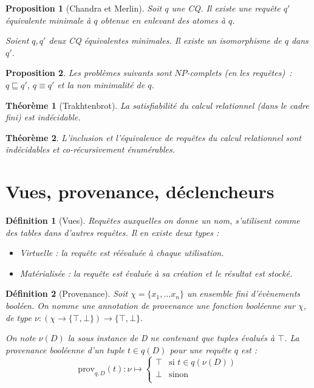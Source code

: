 \documentclass[landscape]{article}
\newcommand{\1}{\mathbbm{1}}
\newcommand{\0}{\mathbbm{0}}
\newtheorem{theo}{Théorème}
\newtheorem{prop}{Proposition}
\newtheorem{defi}{Définition}
\begin{document}
\begin{multicols}{2}
    \begin{prop}[Chandra et Merlin] Soit $q$ une CQ. Il existe une requête $q'$
        équivalente minimale à $q$ obtenue en enlevant des atomes à $q$.

        Soient $q,q'$ deux CQ équivalentes minimales. Il existe un isomorphisme
        de $q$ dans $q'$.
    \end{prop}

    \begin{prop} Les problèmes suivants sont $NP$-complets (en les requêtes)~: $q\sqsubseteq q'$,
        $q \equiv q'$ et la non minimalité de $q$.
    \end{prop}

    \begin{theo}[Trakhtenbrot]
        La satisfiabilité du calcul relationnel (dans le cadre fini) est indécidable.
    \end{theo}

    \begin{theo} L'inclusion et l'équivalence de requêtes du calcul relationnel
        sont indécidables et co-récursivement énumérables.
    \end{theo}

    \section{Vues, provenance, déclencheurs}

    \begin{defi}[Vues] Requêtes auxquelles on donne un nom, s'utilisent comme
        des tables dans d'autres requêtes. Il en existe deux types :\begin{itemize}
            \item Virtuelle : la requête est réévaluée à chaque utilisation.
            \item Matérialisée : la requête est évaluée à sa création et le résultat
                est stocké.
        \end{itemize}
    \end{defi}

    \begin{defi}[Provenance]
        Soit $\chi = \{x_1, \ldots x_n\}$ un ensemble fini d'évènements booléen.
        On nomme une annotation de provenance une fonction booléenne sur $\chi$,
        de type $\nu : (\chi \rightarrow \{\top,\bot\})\rightarrow \{\top,\bot\}$.

        On note $\nu(D)$ la sous instance de D ne contenant que tuples évalués à
        $\top$. La provenance booléenne d'un tuple $t\in q(D)$ pour une requête
        $q$ est :
        \[ \text{prov}_{q,D}(t) : \nu\mapsto\left\{\begin{array}{cl}
            \top & \text{si } t\in q(\nu(D)) \\
            \bot & \text{sinon} \\
        \end{array}\right.\]
    \end{defi}


\end{multicols}
\end{document}
